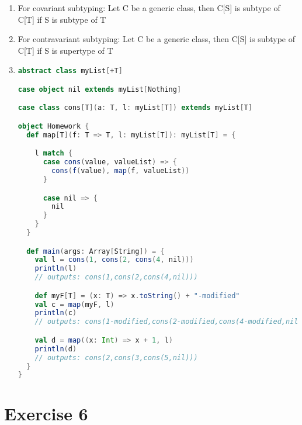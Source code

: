 \documentclass[12pt]{article}
\begin{document}
\begin{enumerate}[label=(\alph*)]

\item For covariant subtyping: Let C be a generic class, then C[S] is subtype of C[T] if S is subtype of T

\item For contravariant subtyping: Let C be a generic class, then C[S] is subtype of C[T] if S is supertype of T 

\item 
\begin{lstlisting}[language=Scala]
abstract class myList[+T]

case object nil extends myList[Nothing]

case class cons[T](a: T, l: myList[T]) extends myList[T]

object Homework {
  def map[T](f: T => T, l: myList[T]): myList[T] = {

    l match {
      case cons(value, valueList) => {
        cons(f(value), map(f, valueList))
      }

      case nil => {
        nil
      }
    }
  }

  def main(args: Array[String]) = {
    val l = cons(1, cons(2, cons(4, nil)))
    println(l)
    // outputs: cons(1,cons(2,cons(4,nil)))

    def myF[T] = (x: T) => x.toString() + "-modified"
    val c = map(myF, l)
    println(c)
    // outputs: cons(1-modified,cons(2-modified,cons(4-modified,nil)))

    val d = map((x: Int) => x + 1, l)
    println(d)
    // outputs: cons(2,cons(3,cons(5,nil)))
  }
}
\end{lstlisting}
\end{enumerate}

\section*{Exercise 6}
\end{document}
